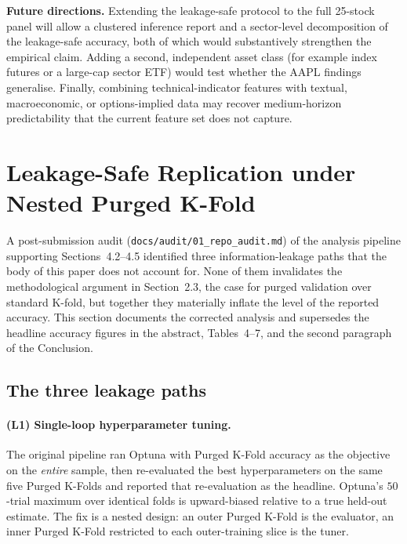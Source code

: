 \documentclass{rQUF2e}
\begin{document}
\noindent \textbf{Future directions.} Extending the leakage-safe
protocol to the full 25-stock panel will allow a clustered
inference report and a sector-level decomposition of the
leakage-safe accuracy, both of which would substantively
strengthen the empirical claim. Adding a second, independent
asset class (for example index futures or a large-cap sector ETF)
would test whether the AAPL findings generalise. Finally,
combining technical-indicator features with textual,
macroeconomic, or options-implied data may recover medium-horizon
predictability that the current feature set does not capture.

\newpage

\section{Leakage-Safe Replication under Nested Purged K-Fold}
\label{sec:addendum}

A post-submission audit (\texttt{docs/audit/01\_repo\_audit.md}) of
the analysis pipeline supporting Sections~4.2--4.5 identified three
information-leakage paths that the body of this paper does not
account for. None of them invalidates the methodological argument
in Section~2.3, the case for purged validation over standard
K-fold, but together they materially inflate the level of the
reported accuracy. This section documents the corrected analysis
and supersedes the headline accuracy figures in the abstract,
Tables~4--7, and the second paragraph of the Conclusion.

\subsection{The three leakage paths}

\paragraph{(L1) Single-loop hyperparameter tuning.} The original
pipeline ran Optuna with Purged K-Fold accuracy as the objective on
the \emph{entire} sample, then re-evaluated the best
hyperparameters on the same five Purged K-Folds and reported that
re-evaluation as the headline. Optuna's $50$-trial maximum over
identical folds is upward-biased relative to a true held-out
estimate. The fix is a nested design: an outer Purged K-Fold is the
evaluator, an inner Purged K-Fold restricted to each outer-training
slice is the tuner.
\end{document}
